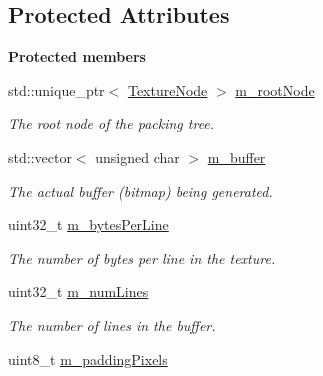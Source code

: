 \subsection*{Protected Attributes}
\begin{Indent}\textbf{ Protected members}\par
\begin{DoxyCompactItemize}
\item 
\mbox{\label{classrev_1_1_texture_packer_a32f9e10455cef8c17594ff8ce5433f5c}} 
std\+::unique\+\_\+ptr$<$ \mbox{\hyperlink{structrev_1_1_texture_node}{Texture\+Node}} $>$ \mbox{\hyperlink{classrev_1_1_texture_packer_a32f9e10455cef8c17594ff8ce5433f5c}{m\+\_\+root\+Node}}
\begin{DoxyCompactList}\small\item\em The root node of the packing tree. \end{DoxyCompactList}\item 
\mbox{\label{classrev_1_1_texture_packer_aa35dc9d23e0a6370094f8401586b36e1}} 
std\+::vector$<$ unsigned char $>$ \mbox{\hyperlink{classrev_1_1_texture_packer_aa35dc9d23e0a6370094f8401586b36e1}{m\+\_\+buffer}}
\begin{DoxyCompactList}\small\item\em The actual buffer (bitmap) being generated. \end{DoxyCompactList}\item 
uint32\+\_\+t \mbox{\hyperlink{classrev_1_1_texture_packer_aafb7e301e8244e3bc43b3a3d706fb30b}{m\+\_\+bytes\+Per\+Line}}
\begin{DoxyCompactList}\small\item\em The number of bytes per line in the texture. \end{DoxyCompactList}\item 
\mbox{\label{classrev_1_1_texture_packer_a8ce7be0714f1b80ae5ee80f727586638}} 
uint32\+\_\+t \mbox{\hyperlink{classrev_1_1_texture_packer_a8ce7be0714f1b80ae5ee80f727586638}{m\+\_\+num\+Lines}}
\begin{DoxyCompactList}\small\item\em The number of lines in the buffer. \end{DoxyCompactList}\item 
uint8\+\_\+t \mbox{\hyperlink{classrev_1_1_texture_packer_a4ca3d5f63ab64524ed7af743248a15c3}{m\+\_\+padding\+Pixels}}

\end{DoxyCompactItemize}
\end{Indent}
